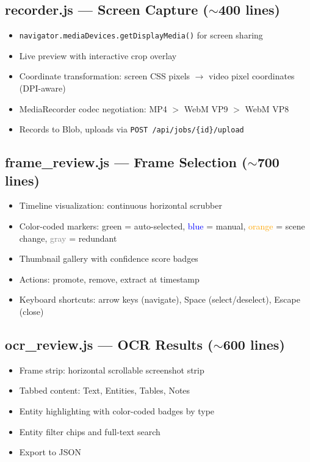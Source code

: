 \documentclass[12pt, a4paper]{article}
\newcommand{\codeinline}[1]{\texttt{\small\colorbox{codebg}{#1}}}
\begin{document}
\subsection{recorder.js --- Screen Capture ($\sim$400 lines)}

\begin{itemize}
    \item \codeinline{navigator.mediaDevices.getDisplayMedia()} for screen sharing
    \item Live preview with interactive crop overlay
    \item Coordinate transformation: screen CSS pixels $\rightarrow$ video pixel coordinates (DPI-aware)
    \item MediaRecorder codec negotiation: MP4 $>$ WebM VP9 $>$ WebM VP8
    \item Records to Blob, uploads via \codeinline{POST /api/jobs/\{id\}/upload}
\end{itemize}

\subsection{frame\_review.js --- Frame Selection ($\sim$700 lines)}

\begin{itemize}
    \item Timeline visualization: continuous horizontal scrubber
    \item Color-coded markers: \textcolor{green!60!black}{green} = auto-selected, \textcolor{blue}{blue} = manual, \textcolor{orange}{orange} = scene change, \textcolor{gray}{gray} = redundant
    \item Thumbnail gallery with confidence score badges
    \item Actions: promote, remove, extract at timestamp
    \item Keyboard shortcuts: arrow keys (navigate), Space (select/deselect), Escape (close)
\end{itemize}

\subsection{ocr\_review.js --- OCR Results ($\sim$600 lines)}

\begin{itemize}
    \item Frame strip: horizontal scrollable screenshot strip
    \item Tabbed content: Text, Entities, Tables, Notes
    \item Entity highlighting with color-coded badges by type
    \item Entity filter chips and full-text search
    \item Export to JSON
\end{itemize}
\end{document}
